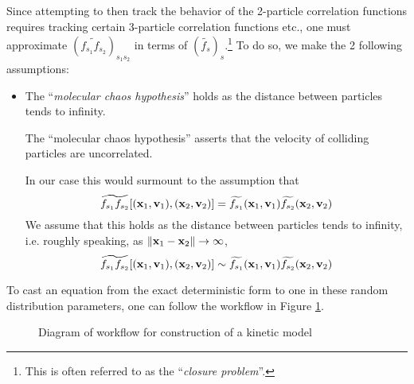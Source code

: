     Since attempting to then track the behavior of the 2-particle correlation functions requires tracking certain 3-particle correlation functions etc., one must approximate $\left(\widetilde{f_{s_{1}}f_{s_{2}}}\right)_{s_{1}s_{2}}$ in terms of $\left(\widetilde{f_{s}}\right)_{s}$.\footnote{This is often referred to as the ``\emph{closure problem}''.} To do so, we make the 2 following assumptions:
    \begin{itemize}
        \item  The ``\emph{molecular chaos hypothesis}'' holds as the distance between particles tends to infinity.
        \begin{definition}
            The ``molecular chaos hypothesis'' asserts that the velocity of colliding particles are uncorrelated. \BA{[Ref]}
        \end{definition}
        In our case this would surmount to the assumption that
        \begin{equation}
            \widetilde{f_{s_{1}}f_{s_{2}}}[(\mathbf{x}_{1}, \mathbf{v}_{1}), (\mathbf{x}_{2}, \mathbf{v}_{2})]  =  \widetilde{f_{s_{1}}}(\mathbf{x}_{1}, \mathbf{v}_{1})\widetilde{f_{s_{2}}}(\mathbf{x}_{2}, \mathbf{v}_{2})
        \end{equation}
        We assume that this holds as the distance between particles tends to infinity, i.e. roughly speaking, as $\|\mathbf{x}_{1} - \mathbf{x}_{2}\|  \rightarrow  \infty$,
        \begin{equation}
            \widetilde{f_{s_{1}}f_{s_{2}}}[(\mathbf{x}_{1}, \mathbf{v}_{1}), (\mathbf{x}_{2}, \mathbf{v}_{2})]  \sim  \widetilde{f_{s_{1}}}(\mathbf{x}_{1}, \mathbf{v}_{1})\widetilde{f_{s_{2}}}(\mathbf{x}_{2}, \mathbf{v}_{2})
        \end{equation}
    \end{itemize}


    To cast an equation from the exact deterministic form to one in these random distribution parameters, one can follow the workflow in Figure \ref{kinetic model construction workflow}.
    \begin{figure}[!h]
        \centering
        \caption{Diagram of workflow for construction of a kinetic model}
        \label{kinetic model construction workflow}
    \end{figure}

